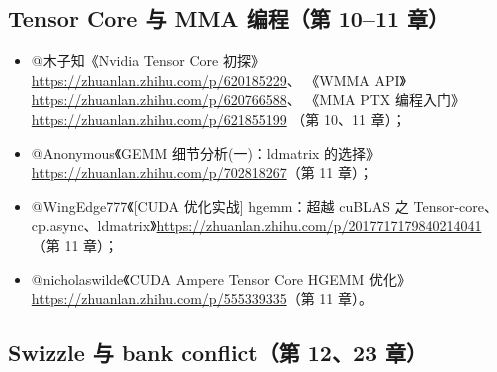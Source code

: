 \subsection{Tensor Core 与 MMA 编程（第 10--11 章）}

\begin{itemize}
  \item @木子知《Nvidia Tensor Core 初探》\url{https://zhuanlan.zhihu.com/p/620185229}、
        《WMMA API》\url{https://zhuanlan.zhihu.com/p/620766588}、
        《MMA PTX 编程入门》\url{https://zhuanlan.zhihu.com/p/621855199}
        （第 10、11 章）；
  \item @Anonymous《GEMM 细节分析(一)：ldmatrix 的选择》
        \url{https://zhuanlan.zhihu.com/p/702818267}（第 11 章）；
  \item @WingEdge777《[CUDA 优化实战] hgemm：超越 cuBLAS 之 Tensor-core、
        cp.async、ldmatrix》\url{https://zhuanlan.zhihu.com/p/2017717179840214041}
        （第 11 章）；
  \item @nicholaswilde《CUDA Ampere Tensor Core HGEMM 优化》
        \url{https://zhuanlan.zhihu.com/p/555339335}（第 11 章）。
\end{itemize}

\subsection{Swizzle 与 bank conflict（第 12、23 章）}

